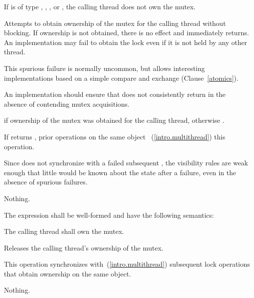 \begin{itemdescr}
\pnum
\requires If  is of type , ,
, or , the calling
thread does not own the mutex.

\pnum
\effects Attempts to obtain ownership of the mutex for the calling thread without
blocking. If ownership is not obtained, there is no effect and 
immediately returns. An implementation may fail to obtain the lock even if it is not
held by any other thread. \begin{note} This spurious failure is normally uncommon, but
allows interesting implementations based on a simple
compare and exchange
(Clause~\ref{atomics}). \end{note}
An implementation should ensure that  does not consistently return 
in the absence of contending mutex acquisitions.

\pnum
\returntype {}

\pnum
\returns {} if ownership of the mutex was obtained for the calling
thread, otherwise .

\pnum
\sync If  returns , prior  operations
on the same object ~(\ref{intro.multithread}) this operation.
\begin{note} Since  does not synchronize with a failed subsequent
, the visibility rules are weak enough that little would be
known about the state after a failure, even in the absence of spurious failures. \end{note}

\pnum
\throws Nothing.
\end{itemdescr}

\pnum
The expression  shall be well-formed and have the following semantics:

\begin{itemdescr}
\pnum
\precondition The calling thread shall own the mutex.

\pnum
\effects Releases the calling thread's ownership of the mutex.

\pnum
\returntype {}

\pnum
\sync This operation synchronizes with~(\ref{intro.multithread}) subsequent
lock operations that obtain ownership on the same object.

\pnum
\throws Nothing.
\end{itemdescr}


